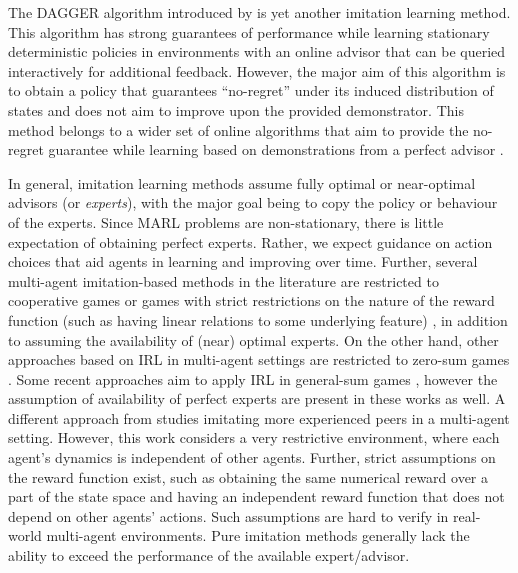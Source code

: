 \documentclass[jair, twoside,11pt,theapa]{article}
\begin{document}
The DAGGER algorithm introduced by \citet{ross2011reduction} is yet another imitation learning method. This algorithm has strong guarantees of performance while learning stationary deterministic policies in environments with an online advisor that can be queried interactively for additional feedback. However, the major aim of this algorithm is to obtain a policy that guarantees ``no-regret'' under its induced distribution of states and does not aim to improve upon the provided demonstrator. This method belongs to a wider set of online algorithms that aim to provide the no-regret guarantee while learning based on demonstrations from a perfect advisor \citep{hazan2007logarithmic, cesa2004generalization, kakade2008mind}. 

In general, imitation learning methods assume fully optimal or near-optimal advisors (or \emph{experts}), with the major goal being to copy the policy or behaviour of the experts. Since MARL problems are non-stationary, there is little expectation of obtaining perfect experts. Rather, we expect guidance on action choices that aid agents in learning and improving over time. Further, several multi-agent imitation-based methods in the literature are restricted to cooperative games \citep{barrett2017making, bogert2014multi} or games with strict restrictions on the nature of the reward function (such as having linear relations to some underlying feature) \citep{reddy2012, waugh2013computational}, in addition to assuming the availability of (near) optimal experts. On the other hand, other approaches based on IRL in multi-agent settings are restricted to zero-sum  games \citep{lin2017multiagent, wang2018competitive}. Some recent approaches aim to apply IRL in general-sum games \citep{yu2019multi, song2018multi}, however the assumption of availability of perfect experts are present in these works as well. A different approach from \citet{price2003accelerating} studies imitating more experienced peers in a multi-agent setting. However, this work considers a very restrictive environment, where each agent's dynamics is independent of other agents. Further, strict assumptions on the reward function exist, such as obtaining the same numerical reward over a part of the state space and having an independent reward function that does not depend on other agents' actions. Such assumptions are hard to verify in real-world multi-agent environments. Pure imitation methods generally lack the ability to exceed the performance of the available expert/advisor. 
\end{document}
